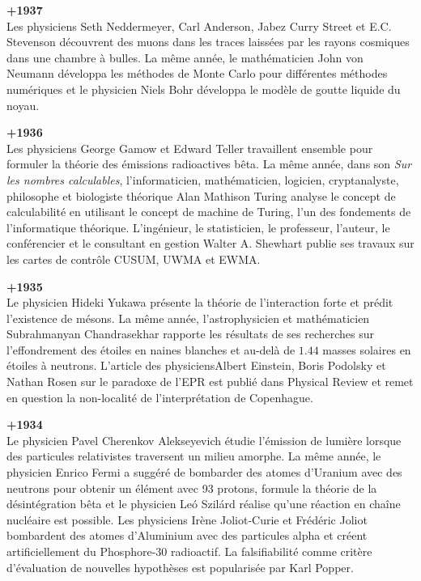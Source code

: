\textbf{+1937}\\
Les physiciens Seth Neddermeyer, Carl Anderson, Jabez Curry Street et E.C. Stevenson découvrent des muons dans les traces laissées par les rayons cosmiques dans une chambre à bulles. La même année, le mathématicien John von Neumann développa les méthodes de Monte Carlo pour différentes méthodes numériques et le physicien Niels Bohr développa le modèle de goutte liquide du noyau.

\textbf{+1936}\\
Les physiciens George Gamow et Edward Teller travaillent ensemble pour formuler la théorie des émissions radioactives bêta. La même année, dans son \textit{Sur les nombres calculables}, l'informaticien, mathématicien, logicien, cryptanalyste, philosophe et biologiste théorique Alan Mathison Turing analyse le concept de calculabilité en utilisant le concept de machine de Turing, l'un des fondements de l'informatique théorique. L'ingénieur, le statisticien, le professeur, l'auteur, le conférencier et le consultant en gestion Walter A. Shewhart publie ses travaux sur les cartes de contrôle CUSUM, UWMA et EWMA.

\textbf{+1935}\\
Le physicien Hideki Yukawa présente la théorie de l'interaction forte et prédit l'existence de mésons. La même année, l'astrophysicien et mathématicien Subrahmanyan Chandrasekhar rapporte les résultats de ses recherches sur l'effondrement des étoiles en naines blanches et au-delà de $1.44$ masses solaires en étoiles à neutrons. L'article des physiciensAlbert Einstein, Boris Podolsky et Nathan Rosen sur le paradoxe de l'EPR est publié dans Physical Review et remet en question la non-localité de l'interprétation de Copenhague.

\textbf{+1934}\\
Le physicien Pavel Cherenkov Alekseyevich étudie l'émission de lumière lorsque des particules relativistes traversent un milieu amorphe. La même année, le physicien Enrico Fermi a suggéré de bombarder des atomes d'Uranium avec des neutrons pour obtenir un élément avec 93 protons, formule la théorie de la désintégration bêta et le physicien Leó Szilárd réalise qu'une réaction en chaîne nucléaire est possible. Les physiciens Irène Joliot-Curie et Frédéric Joliot bombardent des atomes d'Aluminium avec des particules alpha et créent artificiellement du Phosphore-30 radioactif. La falsifiabilité comme critère d'évaluation de nouvelles hypothèses est popularisée par Karl Popper.

